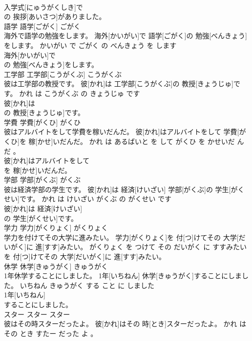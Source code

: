 \documentclass[8pt]{extreport}
\begin{document}
\begin{CJK}{UTF8}{min}
\\	入学式[にゅうがくしき]で
\\	の 挨拶[あいさつ]がありました。			
\\	語学	語学[ごがく]	ごがく	
\\	海外で語学の勉強をします。	海外[かいがい]で 語学[ごがく]の 勉強[べんきょう]をします。	かいがい で ごがく の べんきょう を します	
\\	海外[かいがい]で
\\	の 勉強[べんきょう]をします。			
\\	工学部	工学部[こうがくぶ]	こうがくぶ	
\\	彼は工学部の教授です。	彼[かれ]は 工学部[こうがくぶ]の 教授[きょうじゅ]です。	かれ は こうがくぶ の きょうじゅ です	
\\	彼[かれ]は
\\	の 教授[きょうじゅ]です。			
\\	学費	学費[がくひ]	がくひ	
\\	彼はアルバイトをして学費を稼いだんだ。	彼[かれ]はアルバイトをして 学費[がくひ]を 稼[かせ]いだんだ。	かれ は あるばいと を して がくひ を かせいだ ん だ 。	
\\	彼[かれ]はアルバイトをして
\\	を 稼[かせ]いだんだ。			
\\	学部	学部[がくぶ]	がくぶ	
\\	彼は経済学部の学生です。	彼[かれ]は 経済[けいざい] 学部[がくぶ]の 学生[がくせい]です。	かれ は けいざい がくぶ の がくせい です	
\\	彼[かれ]は 経済[けいざい]
\\	の 学生[がくせい]です。			
\\	学力	学力[がくりょく]	がくりょく	
\\	学力を付けてその大学に進みたい。	学力[がくりょく]を 付[つ]けてその 大学[だいがく]に 進[すす]みたい。	がくりょく を つけて その だいがく に すすみたい	
\\	を 付[つ]けてその 大学[だいがく]に 進[すす]みたい。			
\\	休学	休学[きゅうがく]	きゅうがく	
\\	1年休学することにしました。	1年[いちねん] 休学[きゅうがく]することにしました。	いちねん きゅうがく する こと に しました	
\\	1年[いちねん]
\\	することにしました。			
\\	スター	スター	スター	
\\	彼はその時スターだったよ。	彼[かれ]はその 時[とき]スターだったよ。	かれ は その とき すたー だった よ 。	

\end{CJK}
\end{document}
